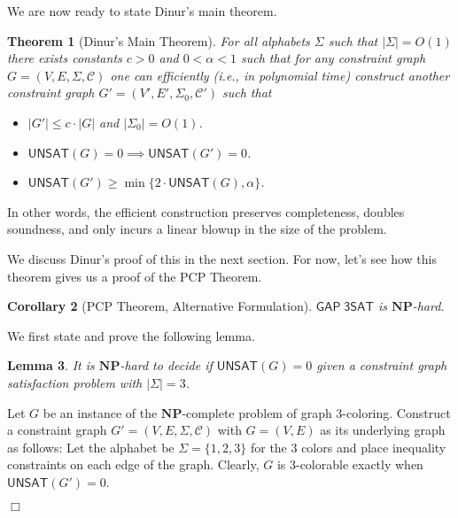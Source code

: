 \documentclass{article}
\newtheorem{theorem}{Theorem}
\newtheorem{example}[theorem]{Example}
\newtheorem{lemma}[theorem]{Lemma}
\newtheorem{corollary}[theorem]{Corollary}
\newenvironment{proof}{\noindent{\bf Proof:} \hspace*{1mm}}{
	\hspace*{\fill} $\Box$ }
\newcommand{\class}[1]{\mathbf{#1}}
\newcommand{\NP}{\class{NP}}
\newcommand{\UNSAT}{\mathsf{UNSAT}}
\newcommand{\GAPSAT}{\mathsf{GAP\;3SAT}}
\begin{document}

We are now ready to state Dinur's main theorem.

\begin{theorem}[Dinur's Main Theorem]\label{dinursthm}
For all alphabets $\Sigma$ such that $|\Sigma| = O(1)$ there exists constants $c > 0$ and
$0 < \alpha < 1$ such that for any constraint graph $G = (V, E, \Sigma, \mathcal{C})$
one can efficiently (i.e., in polynomial time) construct another constraint graph
$G' = (V', E', \Sigma_0, \mathcal{C}')$ such that
\begin{itemize}[leftmargin=10em]
\item[\textbf{(Linear blowup)}] $|G'| \le c \cdot |G|$ and $|\Sigma_0| = O(1)$.
\item[\textbf{(Completeness)}] $\UNSAT(G)=0 \implies \UNSAT(G')=0$.
\item[\textbf{(Soundness)}] $\UNSAT(G')\ge \min\{2\cdot\UNSAT(G), \alpha\}$.
\end{itemize}
\end{theorem}
In other words, the efficient construction preserves completeness, doubles
soundness, and only incurs a linear blowup in the size of the problem.

We discuss Dinur's proof of this in the next section.
For now, let's see how this theorem gives us a proof of the PCP Theorem.

\begin{corollary}[PCP Theorem, Alternative Formulation]\label{corollary}
$\GAPSAT$ is $\NP$-hard.
\end{corollary}

We first state and prove the following lemma.

\begin{lemma}\label{csg-hard} It is $\NP$-hard to decide if $\UNSAT(G)=0$ given
a constraint graph satisfaction problem with $|\Sigma| = 3$.
\end{lemma}

\begin{proof}%
Let $G$ be an instance of the $\NP$-complete problem of graph 3-coloring.
Construct a constraint graph $G'=(V, E, \Sigma, \mathcal{C})$ with
$G = (V,E)$ as its underlying graph as follows:
Let the alphabet be $\Sigma = \{1, 2, 3\}$ for the 3 colors and place
inequality constraints on each edge of the graph.
Clearly, $G$ is 3-colorable exactly when $\UNSAT(G')=0$.
\end{proof}\\
\end{document}
